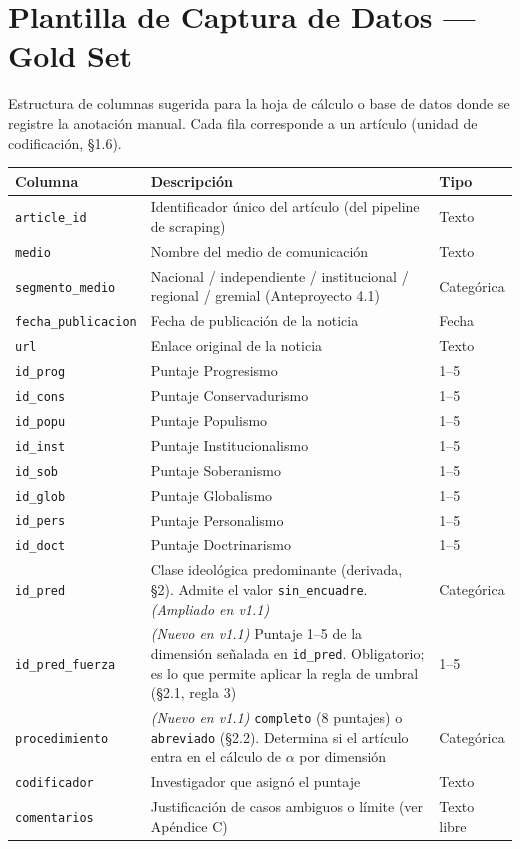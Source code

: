 \documentclass[11pt,letterpaper]{article}
\begin{document}
\section{Plantilla de Captura de Datos — Gold Set}
Estructura de columnas sugerida para la hoja de cálculo o base de datos donde se registre la anotación
manual. Cada fila corresponde a un artículo (unidad de codificación, §1.6).

\begin{longtable}{@{}p{3.5cm}p{9.1cm}p{2.6cm}@{}}
\toprule \textbf{Columna} & \textbf{Descripción} & \textbf{Tipo}\\ \midrule\endhead
\texttt{article\_id} & Identificador único del artículo (del pipeline de scraping) & Texto\\
\texttt{medio} & Nombre del medio de comunicación & Texto\\
\texttt{segmento\_medio} & Nacional / independiente / institucional / regional / gremial (Anteproyecto 4.1) &
Categórica\\
\texttt{fecha\_publicacion} & Fecha de publicación de la noticia & Fecha\\
\texttt{url} & Enlace original de la noticia & Texto\\
\addlinespace
\texttt{id\_prog} & Puntaje Progresismo & 1–5\\
\texttt{id\_cons} & Puntaje Conservadurismo & 1–5\\
\texttt{id\_popu} & Puntaje Populismo & 1–5\\
\texttt{id\_inst} & Puntaje Institucionalismo & 1–5\\
\texttt{id\_sob} & Puntaje Soberanismo & 1–5\\
\texttt{id\_glob} & Puntaje Globalismo & 1–5\\
\texttt{id\_pers} & Puntaje Personalismo & 1–5\\
\texttt{id\_doct} & Puntaje Doctrinarismo & 1–5\\
\addlinespace
\texttt{id\_pred} & Clase ideológica predominante (derivada, §2). Admite el valor
\texttt{sin\_encuadre}. \emph{(Ampliado en v1.1)} & Categórica\\
\texttt{id\_pred\_fuerza} & \emph{(Nuevo en v1.1)} Puntaje 1–5 de la dimensión señalada en
\texttt{id\_pred}. Obligatorio; es lo que permite aplicar la regla de umbral (§2.1, regla 3) & 1–5\\
\texttt{procedimiento} & \emph{(Nuevo en v1.1)} \texttt{completo} (8 puntajes) o \texttt{abreviado}
(§2.2). Determina si el artículo entra en el cálculo de $\alpha$ por dimensión & Categórica\\
\addlinespace
\texttt{codificador} & Investigador que asignó el puntaje & Texto\\
\texttt{comentarios} & Justificación de casos ambiguos o límite (ver Apéndice C) & Texto libre\\
\bottomrule
\end{longtable}
\end{document}
